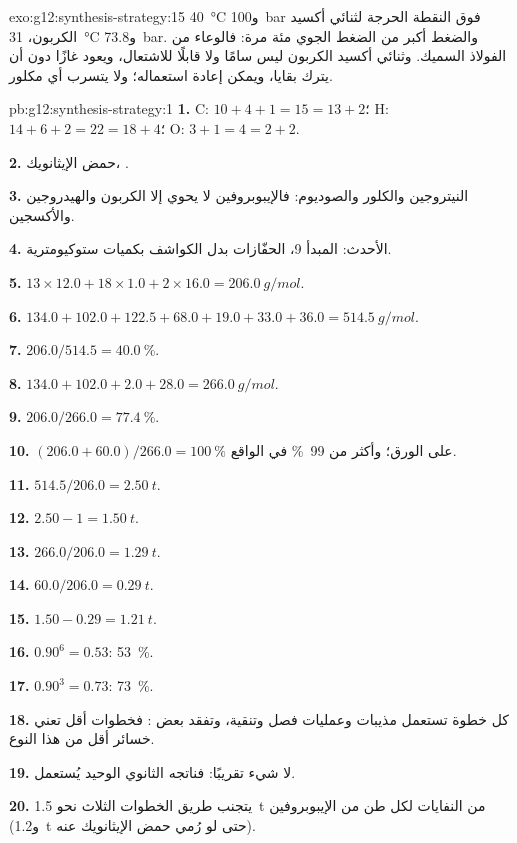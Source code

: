 \begin{solution}{exo:g12:synthesis-strategy:15}
\qty{40}{\celsius} و\qty{100}{bar} فوق النقطة الحرجة
لثنائي أكسيد الكربون، \qty{31}{\celsius} و\qty{73.8}{bar}. والضغط
أكبر من الضغط الجوي مئة مرة: فالوعاء من الفولاذ السميك. وثنائي أكسيد الكربون
ليس سامًا ولا قابلًا للاشتعال، ويعود غازًا
دون أن يترك بقايا، ويمكن إعادة استعماله؛ ولا يتسرب أي  مكلور.
\end{solution}

\begin{solution}{pb:g12:synthesis-strategy:1}
\textbf{1.} C: $10 + 4 + 1 = 15 = 13 + 2$؛ H: $14 + 6 + 2 = 22 = 18 + 4$؛
O: $3 + 1 = 4 = 2 + 2$.

\textbf{2.} حمض الإيثانويك، .

\textbf{3.} النيتروجين والكلور والصوديوم: فالإيبوبروفين لا يحوي إلا الكربون
والهيدروجين والأكسجين.

\textbf{4.} الأحدث: المبدأ 9، الحفّازات بدل الكواشف
بكميات ستوكيومترية.

\textbf{5.} $13 \times 12.0 + 18 \times 1.0 + 2 \times 16.0 =
\qty{206.0}{g/mol}$.

\textbf{6.} $134.0 + 102.0 + 122.5 + 68.0 + 19.0 + 33.0 + 36.0 =
\qty{514.5}{g/mol}$.

\textbf{7.} $206.0/514.5 = \qty{40.0}{\percent}$.

\textbf{8.} $134.0 + 102.0 + 2.0 + 28.0 = \qty{266.0}{g/mol}$.

\textbf{9.} $206.0/266.0 = \qty{77.4}{\percent}$.

\textbf{10.} $(206.0 + 60.0)/266.0 = \qty{100}{\percent}$ على الورق؛ وأكثر من
\qty{99}{\percent} في الواقع.

\textbf{11.} $514.5/206.0 = \qty{2.50}{t}$.

\textbf{12.} $2.50 - 1 = \qty{1.50}{t}$.

\textbf{13.} $266.0/206.0 = \qty{1.29}{t}$.

\textbf{14.} $60.0/206.0 = \qty{0.29}{t}$.

\textbf{15.} $1.50 - 0.29 = \qty{1.21}{t}$.

\textbf{16.} $0.90^6 = 0.53$: \qty{53}{\percent}.

\textbf{17.} $0.90^3 = 0.73$: \qty{73}{\percent}.

\textbf{18.} كل خطوة تستعمل مذيبات وعمليات فصل وتنقية،
وتفقد بعض : فخطوات أقل تعني خسائر أقل من هذا النوع.

\textbf{19.} لا شيء تقريبًا: فناتجه الثانوي الوحيد يُستعمل.

\textbf{20.} يتجنب طريق الخطوات الثلاث نحو \qty{1.5}{t} من النفايات لكل
طن من الإيبوبروفين (و\qty{1.2}{t} حتى لو رُمي حمض الإيثانويك
 عنه).
\end{solution}

